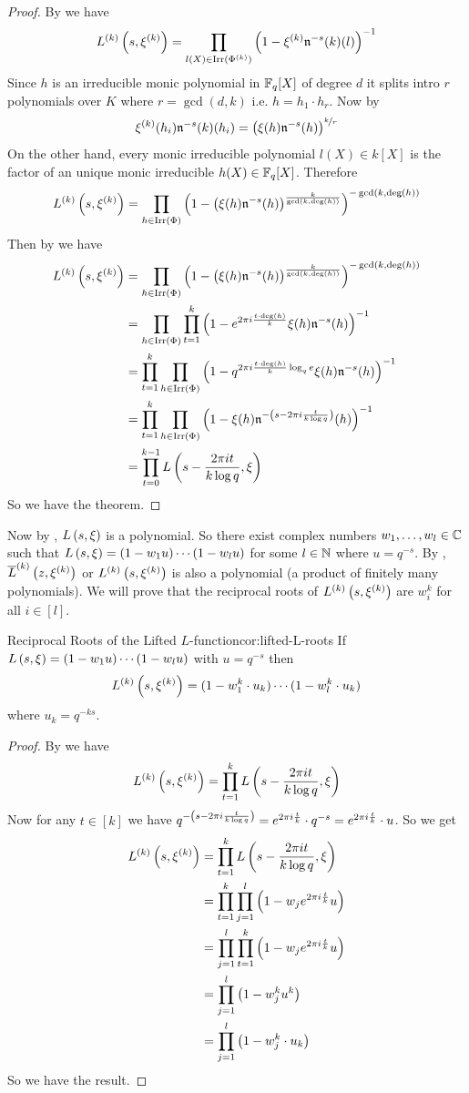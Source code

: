 \begin{proof}
  By \LEulerProdthm we have $$L^{(k)}\left(s,\xi^{(k)}\right)=\prod_{l(X)\in\operatorname{Irr}(\Phi^{(k)})}\left(1-\xi^{(k)}\mathfrak{n}^{-s}{(k)}(l)\right)^{-1}$$Since $h$ is an irreducible monic polynomial in $\mathbb{F}_q[X]$ of degree $d$ it splits intro $r$ polynomials over $K$ where $r=\gcd(d,k)$ i.e. $h=h_1\cdot h_r$. Now by \IrrSplitslem $$\xi^{(k)}(h_i)\mathfrak{n}^{-s}{(k)}(h_i)=\left(\xi(h)\mathfrak{n}^{-s}(h)\right)^{\nicefrac{k}{r}}$$On the other hand, every monic irreducible polynomial $l(X)\in k[X]$ is the factor of an unique monic irreducible $h(X)\in\mathbb{F}_q[X]$. Therefore $$L^{(k)}\left(s,\xi^{(k)}\right)=\prod_{h\in\operatorname{Irr}(\Phi)}\left(1-\left(\xi(h)\mathfrak{n}^{-s}(h)\right)^{\frac{k}{\gcd(k,\deg(h))}}\right)^{-\gcd(k,\deg(h))}$$Then by \RootsUnityProdlem we have 
  \begin{align*}
    L^{(k)}\left(s,\xi^{(k)}\right) & = \prod_{h\in\operatorname{Irr}(\Phi)}\left(1-\left(\xi(h)\mathfrak{n}^{-s}(h)\right)^{\frac{k}{\gcd(k,\deg(h))}}\right)^{-\gcd(k,\deg(h))}\\ 
    & = \prod_{h\in\operatorname{Irr}(\Phi)}\prod_{t=1}^k\left(1-e^{2\pi i\frac{t\cdot \deg(h)}{k}}\xi(h)\mathfrak{n}^{-s}(h)\right)^{-1}\\ 
    & = \prod_{t=1}^k \prod_{h\in\operatorname{Irr}(\Phi)}\left(1-q^{2\pi i\frac{t\cdot \deg(h)}k \log_qe}\xi(h)\mathfrak{n}^{-s}(h)\right)^{-1}\\ 
    & = \prod_{t=1}^k \prod_{h\in\operatorname{Irr}(\Phi)}\left(1-\xi(h)\mathfrak{n}^{-\left(s-2\pi i\frac{t}{k\log q}\right)}(h)\right)^{-1}\\ 
    & = \prod_{t=0}^{k-1}L\left(s-\frac{2\pi it}{k\log q},\xi\right)
  \end{align*}So we have the theorem. 
\end{proof}
Now by \LXiFinitethm, $L\left(s,\xi\right)$ is a polynomial. So there exist complex numbers $w_1,\dots, w_l\in\mathbb{C}$ such that $L\left(s,\xi\right)=(1-w_1u)\cdots (1-w_lu)$ for some $l\in\mathbb{N}$ where $u=q^{-s}$. By \LiftedLFactthm, $\overline{L}^{(k)}\left(z,\xi^{(k)}\right)$ or $L^{(k)}\left(s,\xi^{(k)}\right)$ is also a polynomial (a product of finitely many polynomials). We will prove that the reciprocal roots of $L^{(k)}\left(s,\xi^{(k)}\right)$ are $w_i^k$ for all $i\in[l]$. 
\begin{corolary}{Reciprocal Roots of the Lifted $L$-function}{cor:lifted-L-roots}
  If $L\left(s,\xi\right)=(1-w_1u)\cdots (1-w_lu)$ with $u=q^{-s}$ then $$L^{(k)}\left(s,\xi^{(k)}\right)=(1-w_1^k\cdot u_k)\cdots (1-w_l^k\cdot u_k)$$where $u_k=q^{-ks}$.
\end{corolary}
\begin{proof}
  By \LiftedLFactthm we have $$L^{(k)}\left(s,\xi^{(k)}\right)=\prod_{t=1}^kL\left(s-\frac{2\pi it}{k\log q},\xi\right)$$ Now for any $t\in[k]$ we have $q^{-\left(s-2\pi i\frac{t}{k\log q}\right)}=e^{2\pi i \frac{t}{k}}\cdot q^{-s}=e^{2\pi i\frac{t}{k}}\cdot u$. So we get
  \begin{align*}
    L^{(k)}\left(s,\xi^{(k)}\right) & = \prod_{t=1}^k L\left(s-\frac{2\pi it}{k\log q},\xi\right)\\
    & = \prod_{t=1}^k \prod_{j=1}^l \left(1-w_je^{2\pi i\frac{t}{k}}u\right)\\
    & = \prod_{j=1}^l \prod_{t=1}^k \left(1-w_je^{2\pi i\frac{t}{k}}u\right)\\
    & = \prod_{j=1}^l \left(1-w_j^ku^k\right)\\
    & = \prod_{j=1}^l \left(1-w_j^k\cdot u_k\right)
  \end{align*}
  So we have the result. 
\end{proof}


